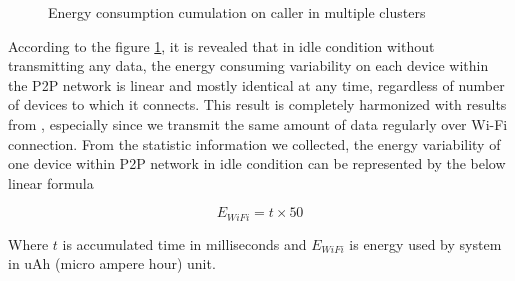 \documentclass[conference]{IEEEtran}
\begin{document}
\begin{figure}[H]
	\hspace*{-0.15cm}
	\caption{Energy consumption cumulation on caller in multiple clusters}
	\label{fig:microb_24}
\end{figure}

According to the figure \ref{fig:microb_24}, it is revealed that in idle condition without transmitting any data, the energy consuming variability on each device within the P2P network is linear and mostly identical at any time, regardless of number of devices to which it connects. This result is completely harmonized with results from \cite{wifi_energy}, especially since we transmit the same amount of data regularly over Wi-Fi connection. From the statistic information we collected, the energy variability of one device within P2P network in idle condition can be represented by the below linear formula

\begin{equation}
\label{eq:wifi_overload}
E_{WiFi} = t \times 50
\end{equation}

Where $t$ is accumulated time in milliseconds and $E_{WiFi}$ is energy used by system in uAh (micro ampere hour) unit.
\end{document}

